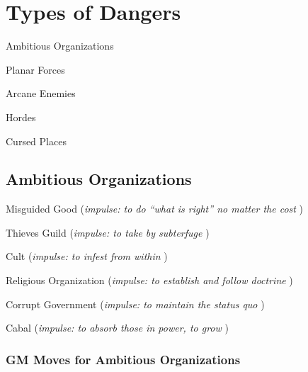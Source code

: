 \section{Types of Dangers}    
       
\startitemize[1,packed]
         
\item Ambitious Organizations

         
\item Planar Forces

         
\item Arcane Enemies

         
\item Hordes

         
\item Cursed Places

       
\stopitemize
       
\subsection{Ambitious Organizations}    
       
\startitemize[1,packed]
         
\item Misguided Good ({\em impulse: to do “what is right” no matter the cost} )

         
\item Thieves Guild ({\em impulse: to take by subterfuge} )

         
\item Cult ({\em impulse: to infest from within} )

         
\item Religious Organization ({\em impulse: to establish and follow doctrine} )

         
\item Corrupt Government ({\em impulse: to maintain the status quo} )

         
\item Cabal ({\em impulse: to absorb those in power, to grow} )

       
\stopitemize
       
\subsubsection{GM Moves for Ambitious Organizations}      
       
